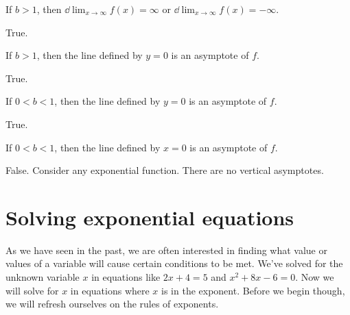 \begin{exercises}
\begin{problem}
\begin{subproblem}
	If $b>1$, then $\dd\lim_{x\to\infty}f(x)=\infty$ or $\dd\lim_{x\to\infty}f(x)=-\infty$.
	\begin{shortsolution}
		True.
	\end{shortsolution}
\end{subproblem}
\begin{subproblem}
	If $b>1$, then the line defined by $y=0$ is an asymptote of $f$.
	\begin{shortsolution}
		True.
	\end{shortsolution}
\end{subproblem}
\begin{subproblem}
	If $0<b<1$, then the line defined by $y=0$ is an asymptote of $f$.
	\begin{shortsolution}
		True.
	\end{shortsolution}
\end{subproblem}
\begin{subproblem}
	If $0<b<1$, then the line defined by $x=0$ is an asymptote of $f$.
	\begin{shortsolution}
		False.  Consider any exponential function.  There are no vertical asymptotes.
	\end{shortsolution}
\end{subproblem}
\end{problem}
\end{exercises}

\section{Solving exponential equations}
As we have seen in the past, we are often interested in finding what value or values of a variable will cause certain conditions to be met.  
We've solved for the unknown variable $x$ in equations like $2x+4=5$ and $x^2+8x-6=0$.  Now we will solve for $x$ in equations where $x$ is in the exponent.
Before we begin though, we will refresh ourselves on the rules of exponents.

